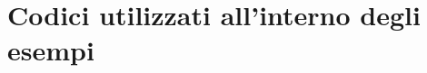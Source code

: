 \chapter{Codici utilizzati all'interno degli esempi}
    \begin{spacing}{1}
        
        \newpage
        
    \end{spacing}